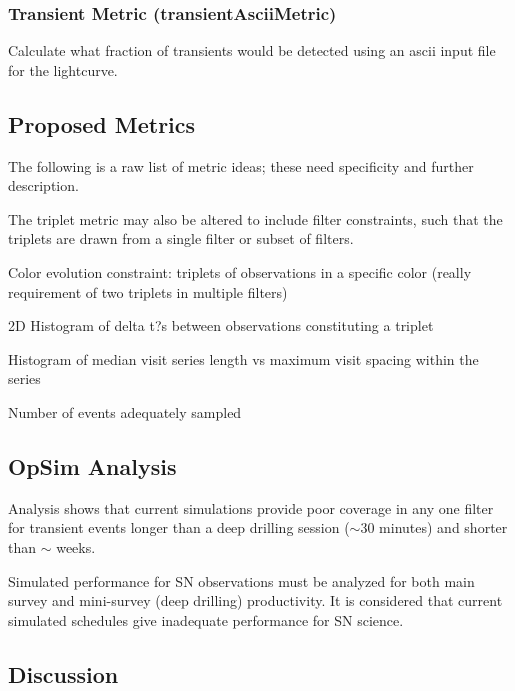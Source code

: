 \subsubsection{Transient Metric (transientAsciiMetric)}

Calculate what fraction of transients would be detected using an ascii input file for the lightcurve.

\subsection{Proposed Metrics}

The following is a raw list of metric ideas; these need specificity and further description.

The triplet metric may also be altered to include filter constraints, such that the triplets are drawn from a single filter or subset of filters.

Color evolution constraint: triplets of observations in a specific color (really requirement of two triplets in multiple filters)

  2D Histogram of delta t?s between observations constituting a triplet

Histogram of median visit series length vs maximum visit spacing within the series

Number of events adequately sampled


\subsection{OpSim Analysis}
\label{sec:\secname:analysis}

Analysis shows that current simulations provide  poor coverage in any one filter for transient events longer than a deep drilling session ($\sim$30 minutes) and shorter than $\sim$ weeks.

Simulated performance for SN observations must be analyzed for both main survey and mini-survey (deep drilling) productivity.  It is considered that current simulated schedules give inadequate performance for SN science.




\subsection{Discussion}
\label{sec:\secname:discussion}


